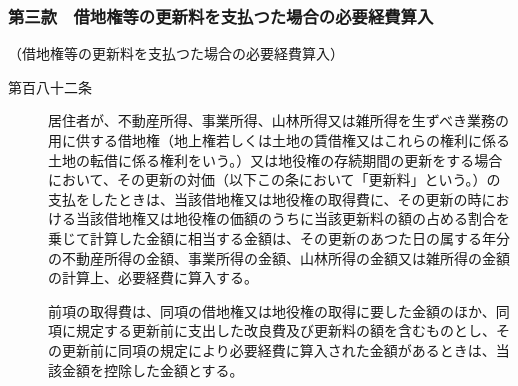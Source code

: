 \documentclass[twocolumn,a4j,10pt]{ltjtarticle}
\begin{document}
\subsubsection*{第三款　借地権等の更新料を支払つた場合の必要経費算入}
\noindent\hspace{10pt}（借地権等の更新料を支払つた場合の必要経費算入）
\begin{description}
\item[第百八十二条]居住者が、不動産所得、事業所得、山林所得又は雑所得を生ずべき業務の用に供する借地権（地上権若しくは土地の賃借権又はこれらの権利に係る土地の転借に係る権利をいう。）又は地役権の存続期間の更新をする場合において、その更新の対価（以下この条において「更新料」という。）の支払をしたときは、当該借地権又は地役権の取得費に、その更新の時における当該借地権又は地役権の価額のうちに当該更新料の額の占める割合を乗じて計算した金額に相当する金額は、その更新のあつた日の属する年分の不動産所得の金額、事業所得の金額、山林所得の金額又は雑所得の金額の計算上、必要経費に算入する。
\item[]前項の取得費は、同項の借地権又は地役権の取得に要した金額のほか、同項に規定する更新前に支出した改良費及び更新料の額を含むものとし、その更新前に同項の規定により必要経費に算入された金額があるときは、当該金額を控除した金額とする。
\end{description}
\end{document}
